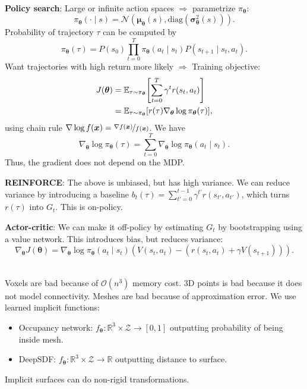 \documentclass{article}
\newcommand{\lft}{\mathopen{}\mathclose\bgroup\left}
\newcommand{\rgt}{\aftergroup\egroup\right}
\newcommand{\E}{\mathbb{E}}
\newcommand{\R}{\mathbb{R}}
\renewcommand{\vec}[1]{\bm{#1}}
\newenvironment{topic}[1]
{\textbf{\sffamily \colorbox{black}{\rlap{\textbf{\textcolor{white}{#1}}}\hspace{\linewidth}\hspace{-2\fboxsep}}} \\ \vspace{0.2cm}}
{}
\begin{document}
\begin{multicols*}{2}
\begin{topic}{Reinforcement learning}
        \textbf{Policy search}: Large or infinite action spaces $\Rightarrow$ parametrize
        $\pi_{\vec{\theta}}$: \[
            \pi_{\vec{\theta}}(\cdot \mid s) = \mathcal{N}(\vec{\mu}_{\vec{\theta}}(s), \mathrm{diag}(\vec{\sigma}_{\vec{\theta}}^2(s))).
        \]
        Probability of trajectory $\tau$ can be computed by \[
            \pi_{\vec{\theta}}(\tau) = P(s_0) \prod_{t=0}^T \pi_{\vec{\theta}}(a_t \mid s_t) P(s_{t+1} \mid s_t, a_t).
        \]
        Want trajectories with high return more likely $\Rightarrow$ Training objective:
        \begin{align*}
            J(\vec{\theta}) & = \E_{\tau \sim \pi_{\vec{\theta}}} \lft[ \sum_{t=0}^{T} \gamma^t r(s_t, a_t) \rgt]                  \\
                            & = \E_{\tau \sim \pi_{\vec{\theta}}} [ r(\tau) \nabla_{\vec{\theta}} \log \pi_{\vec{\theta}}(\tau) ],
        \end{align*}
        using chain rule $\nabla \log f(\vec{x}) = \nicefrac{\nabla f(\vec{x})}{f(\vec{x})}$. We have \[
            \nabla_{\vec{\theta}} \log \pi_{\vec{\theta}}(\tau) = \sum_{t=0}^{T} \nabla_{\vec{\theta}} \log \pi_{\vec{\theta}}(a_t \mid s_t).
        \]
        Thus, the gradient does not depend on the MDP.

        \textbf{REINFORCE}: The above is unbiased, but has high variance. We can reduce variance by
        introducing a baseline $b_t(\tau) = \sum_{t'=0}^{t-1} \gamma^{t'} r(s_{t'}, a_{t'})$, which
        turns $r(\tau)$ into $G_t$. This is on-policy.

        \textbf{Actor-critic}: We can make it off-policy by estimating $G_t$ by bootstrapping using a value network. This introduces bias, but reduces variance: \[
            \nabla_{\vec{\theta}} J(\vec{\theta}) = \nabla_{\vec{\theta}} \log \pi_{\vec{\theta}} (a_t \mid s_t) (V(s_t, a_t) - (r(s_t, a_t) + \gamma V(s_{t+1}))).
        \]

    \end{topic}

    \begin{topic}{Implicit surfaces and neural radiance fields}
        Voxels are bad because of $\mathcal{O}(n^3)$ memory cost. 3D points is bad because it does not
        model connectivity. Meshes are bad because of approximation error. We use learned implicit
        functions:
        \begin{itemize}
            \item Occupancy network: $f_{\vec{\theta}}: \R^3 \times \mathcal{Z} \to [0,1]$ outputting probability of
                  being inside mesh.
            \item DeepSDF: $f_{\vec{\theta}}: \R^3 \times \mathcal{Z} \to \R$ outputting distance to surface.
        \end{itemize}
        Implicit surfaces can do non-rigid transformations.


\end{topic}
\end{multicols*}
\end{document}
